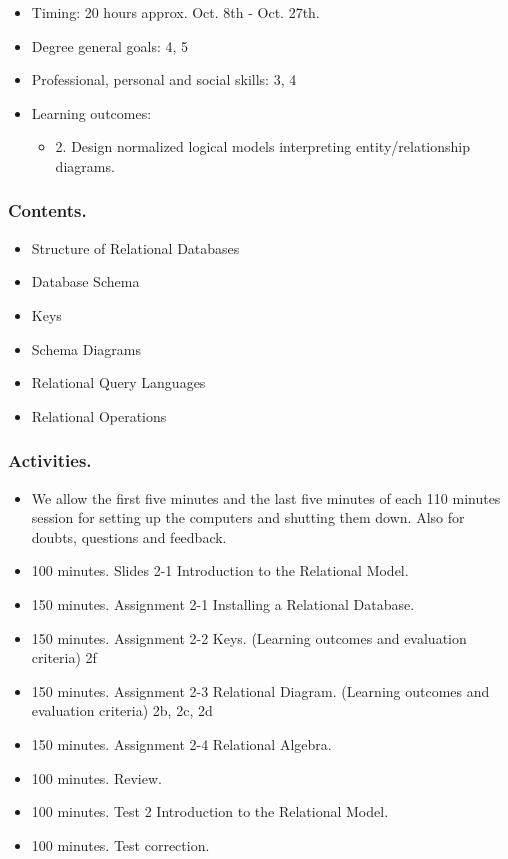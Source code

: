 \documentclass[catalan, a4paper, 12pt, titlepage]{article}
\begin{document}
  \begin{itemize}
	\item Timing: 20 hours approx. Oct. 8th - Oct. 27th.
	\item Degree general goals: 4, 5
	\item Professional, personal and social skills: 3, 4
	\item Learning outcomes: 
		\begin{itemize}
			\item 2. Design normalized logical models interpreting entity/relationship diagrams.
		\end{itemize}
  \end{itemize}

  \subsubsection{Contents.}

  \begin{itemize}
	  \item Structure of Relational Databases
	  \item Database Schema
	  \item Keys
	  \item Schema Diagrams
	  \item Relational Query Languages
	  \item Relational Operations
  \end{itemize}

  \subsubsection{Activities.}

  \begin{itemize}
          \item We allow the first five minutes and the last five minutes of each 110 minutes session for setting up the computers and shutting them down. Also for doubts, questions and feedback.
          \item 100 minutes. Slides 2-1 Introduction to the Relational Model.
	  \item 150 minutes. Assignment 2-1 Installing a Relational Database.
	  \item 150 minutes. Assignment 2-2 Keys. (\faGraduationCap Learning outcomes and evaluation criteria) 2f
	  \item 150 minutes. Assignment 2-3 Relational Diagram. (\faGraduationCap Learning outcomes and evaluation criteria) 2b, 2c, 2d
	  \item 150 minutes. Assignment 2-4 Relational Algebra.
	  \item 100 minutes. Review.
	  \item 100 minutes. Test 2 Introduction to the Relational Model.
	  \item 100 minutes. Test correction.
  \end{itemize}
\end{document}
